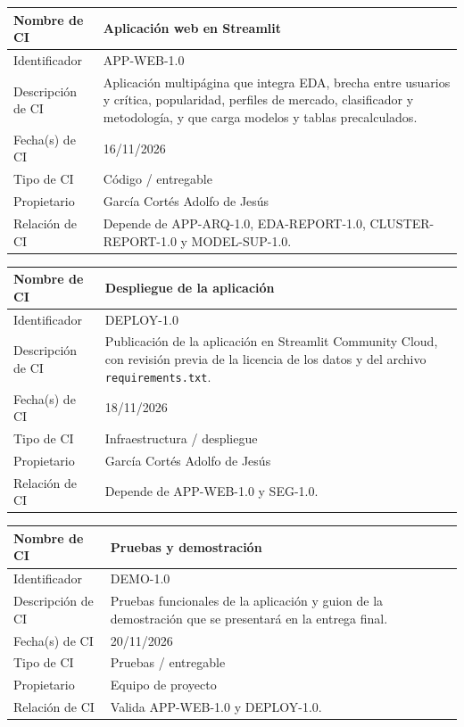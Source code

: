 \documentclass[letterpaper,11pt]{article}
\begin{document}
\noindent\begin{minipage}{\textwidth}
\small\renewcommand{\arraystretch}{1.9}
\begin{tabularx}{\textwidth}{|p{3.3cm}|Y|}
\hline
Nombre de CI & Aplicación web en Streamlit \\ \hline
Identificador & APP-WEB-1.0 \\ \hline
Descripción de CI & Aplicación multipágina que integra EDA, brecha entre usuarios y crítica, popularidad, perfiles de mercado, clasificador y metodología, y que carga modelos y tablas precalculados. \\ \hline
Fecha(s) de CI & 16/11/2026 \\ \hline
Tipo de CI & Código / entregable \\ \hline
Propietario & García Cortés Adolfo de Jesús \\ \hline
Relación de CI & Depende de APP-ARQ-1.0, EDA-REPORT-1.0, CLUSTER-REPORT-1.0 y MODEL-SUP-1.0. \\ \hline
\end{tabularx}
\end{minipage}\par\bigskip
\noindent\begin{minipage}{\textwidth}
\small\renewcommand{\arraystretch}{1.9}
\begin{tabularx}{\textwidth}{|p{3.3cm}|Y|}
\hline
Nombre de CI & Despliegue de la aplicación \\ \hline
Identificador & DEPLOY-1.0 \\ \hline
Descripción de CI & Publicación de la aplicación en Streamlit Community Cloud, con revisión previa de la licencia de los datos y del archivo \texttt{requirements.txt}. \\ \hline
Fecha(s) de CI & 18/11/2026 \\ \hline
Tipo de CI & Infraestructura / despliegue \\ \hline
Propietario & García Cortés Adolfo de Jesús \\ \hline
Relación de CI & Depende de APP-WEB-1.0 y SEG-1.0. \\ \hline
\end{tabularx}
\end{minipage}\par\bigskip
\noindent\begin{minipage}{\textwidth}
\small\renewcommand{\arraystretch}{1.9}
\begin{tabularx}{\textwidth}{|p{3.3cm}|Y|}
\hline
Nombre de CI & Pruebas y demostración \\ \hline
Identificador & DEMO-1.0 \\ \hline
Descripción de CI & Pruebas funcionales de la aplicación y guion de la demostración que se presentará en la entrega final. \\ \hline
Fecha(s) de CI & 20/11/2026 \\ \hline
Tipo de CI & Pruebas / entregable \\ \hline
Propietario & Equipo de proyecto \\ \hline
Relación de CI & Valida APP-WEB-1.0 y DEPLOY-1.0. \\ \hline
\end{tabularx}
\end{minipage}\par\bigskip
\end{document}
